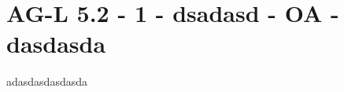 \section{AG-L 5.2 - 1 - dsadasd - OA - dasdasda}

\begin{beispiel}[AG-L 5.2]{1}
adasdasdasdasda
\end{beispiel}